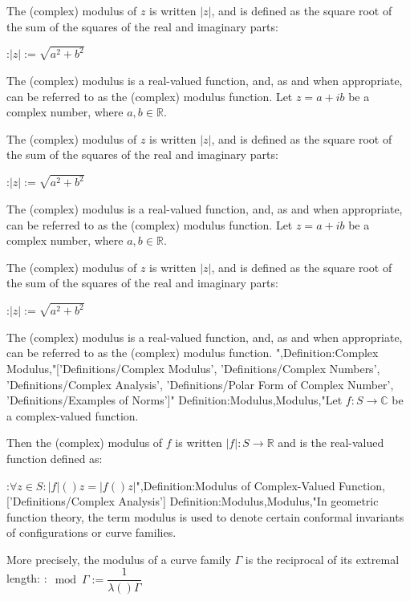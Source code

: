 The (complex) modulus of $z$ is written $\left\lvert z \right\rvert$, and is defined as the square root of the sum of the squares of the real and imaginary parts:

:$\left\lvert z \right\rvert := \sqrt {a^2 + b^2}$


The (complex) modulus is a real-valued function, and, as and when appropriate, can be referred to as the (complex) modulus function.
Let $z = a + i b$ be a complex number, where $a, b \in \mathbb R$.


The (complex) modulus of $z$ is written $\left\lvert z \right\rvert$, and is defined as the square root of the sum of the squares of the real and imaginary parts:

:$\left\lvert z \right\rvert := \sqrt {a^2 + b^2}$


The (complex) modulus is a real-valued function, and, as and when appropriate, can be referred to as the (complex) modulus function.
Let $z = a + i b$ be a complex number, where $a, b \in \mathbb R$.


The (complex) modulus of $z$ is written $\left\lvert z \right\rvert$, and is defined as the square root of the sum of the squares of the real and imaginary parts:

:$\left\lvert z \right\rvert := \sqrt {a^2 + b^2}$


The (complex) modulus is a real-valued function, and, as and when appropriate, can be referred to as the (complex) modulus function.
",Definition:Complex Modulus,"['Definitions/Complex Modulus', 'Definitions/Complex Numbers', 'Definitions/Complex Analysis', 'Definitions/Polar Form of Complex Number', 'Definitions/Examples of Norms']"
Definition:Modulus,Modulus,"Let $f: S \to \mathbb C$ be a complex-valued function.


Then the (complex) modulus of $f$ is written $\left\lvert f \right\rvert : S \to \mathbb R$ and is the real-valued function defined as:

:$\forall z \in S: \left\lvert f \right\rvert \left(   \right)z = \left\lvert f \left(   \right)z \right\rvert$",Definition:Modulus of Complex-Valued Function,['Definitions/Complex Analysis']
Definition:Modulus,Modulus,"In geometric function theory, the term modulus is used to denote certain conformal invariants of configurations or curve families.

More precisely, the modulus of a curve family $\Gamma$ is the reciprocal of its extremal length:
:$\mod \Gamma := \dfrac 1 {\lambda \left(   \right)\Gamma}$


